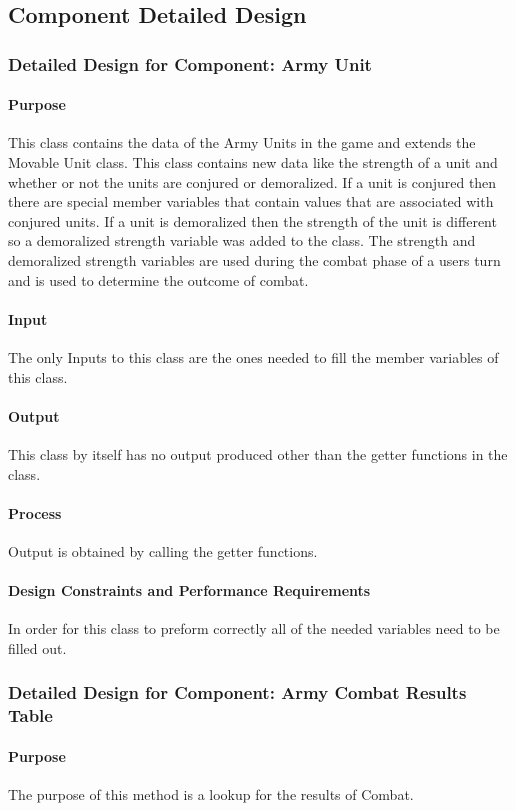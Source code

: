 \documentclass[12pt,a4paper,titlepage]{article}
\begin{document}
\subsection{Component Detailed Design}
\subsubsection{Detailed Design for Component: Army Unit}
\paragraph{Purpose} This class contains the data of the Army Units in the game and extends the Movable Unit class. This class contains new data like the strength of a unit and whether or not the units are conjured or demoralized. If a unit is conjured then there are special member variables that contain values that are associated with conjured units. If a unit is demoralized then the strength of the unit is different so a demoralized strength variable was added to the class. The strength and demoralized strength variables are used during the combat phase of a users turn and is used to determine the outcome of combat. 
\paragraph{Input} The only Inputs to this class are the ones needed to fill the member variables of this class.
\paragraph{Output} This class by itself has no output produced other than the getter functions in the class.
\paragraph{Process} Output is obtained by calling the getter functions. 
\paragraph{Design Constraints and Performance Requirements}	In order for this class to preform correctly all of the needed variables need to be filled out.

\subsubsection{Detailed Design for Component: Army Combat Results Table}
\paragraph{Purpose} The purpose of this method is a lookup for the results of Combat. 
\end{document}
